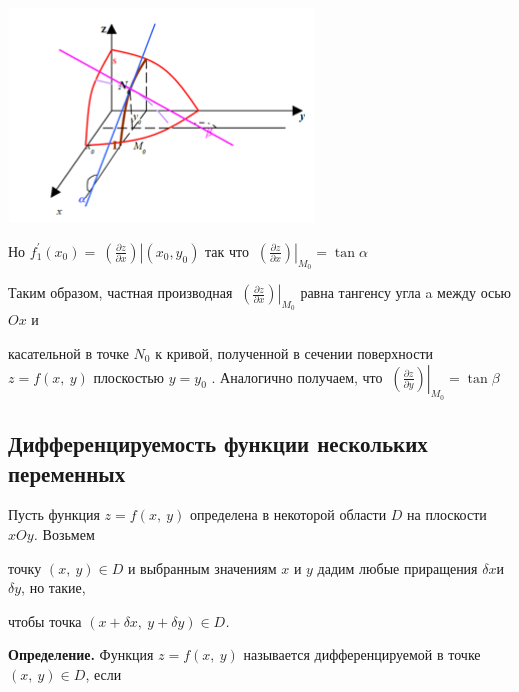 \includegraphics[width=3.21631in,height=2.24359in]{23img.png}

Но
$f_{1}^{'}\left( x_{0} \right) = \left. \ \left( \frac{\partial z}{\partial x} \right) \right|\left( x_{0},y_{0} \right)$
так что
$\left. \ \left( \frac{\partial z}{\partial x} \right) \right|_{M_{0}} = \tan\alpha$

Таким образом, частная производная
$\left. \ \left( \frac{\partial z}{\partial x} \right) \right|_{M_{0}}$
равна тангенсу угла a между осью $Ox$ и

касательной в точке \emph{$N_0$} к кривой, полученной в сечении поверхности
$z = f(x,\ y)$ плоскостью $y = y_{0}$ . Аналогично получаем, что
$\left. \ \left( \frac{\partial z}{\partial y} \right) \right|_{M_{0}} = \tan\beta$

\hypertarget{ux434ux438ux444ux444ux435ux440ux435ux43dux446ux438ux440ux443ux435ux43cux43eux441ux442ux44c-ux444ux443ux43dux43aux446ux438ux438-ux43dux435ux441ux43aux43eux43bux44cux43aux438ux445-ux43fux435ux440ux435ux43cux435ux43dux43dux44bux445}{%
\subsection{\texorpdfstring{\textbf{Дифференцируемость функции
нескольких
переменных}}{Дифференцируемость функции нескольких переменных}}\label{ux434ux438ux444ux444ux435ux440ux435ux43dux446ux438ux440ux443ux435ux43cux43eux441ux442ux44c-ux444ux443ux43dux43aux446ux438ux438-ux43dux435ux441ux43aux43eux43bux44cux43aux438ux445-ux43fux435ux440ux435ux43cux435ux43dux43dux44bux445}}

Пусть функция $z = f(x,\ y)$ определена в некоторой области $D$ на
плоскости $xOy$\emph{.} Возьмем

точку $(x,\ y) \in D$ и выбранным значениям $x$ и $y$ дадим любые
приращения $\delta x $и $\delta y$, но такие,

чтобы точка $(x + \delta x,\ y + \delta y) \in D$\emph{.}

\textbf{Определение.} Функция $z = f(x,\ y)$ называется
дифференцируемой в точке $(x,\ y) \in D$, если


